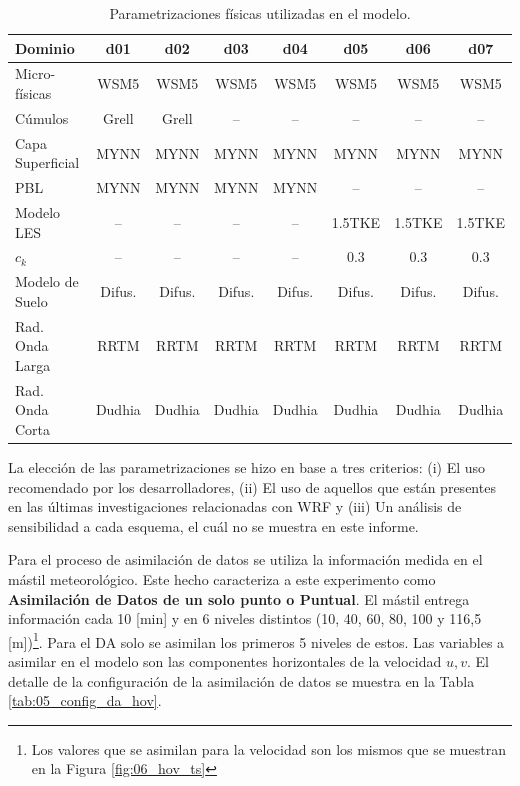 \begin{table}[h!]
	\caption{Parametrizaciones físicas utilizadas en el modelo.}\label{tab:05_param_hov}
	\centering\footnotesize
	\begin{tabular}{lccccccc}
		\toprule
		Dominio 				& d01	&	d02	&	d03	&	d04	&	d05	&	d06 &	d07 \\
		\midrule
		Micro-físicas		 	& WSM5 & WSM5 & WSM5 &WSM5&WSM5&WSM5&WSM5  \\
		Cúmulos			 		& Grell & Grell & -- & -- & -- & -- & -- \\ 
		Capa Superficial	 	& MYNN & MYNN & MYNN & MYNN & MYNN & MYNN & MYNN \\
		PBL				 		& MYNN & MYNN & MYNN & MYNN & -- & -- & -- \\
		Modelo LES				 		& -- & -- & -- & -- & 1.5TKE & 1.5TKE & 1.5TKE \\
		$c_k$				 		& -- & -- & -- & -- & 0.3 & 0.3 & 0.3 \\
		Modelo de Suelo 		& Difus.\footnotemark & Difus. & Difus. & Difus. & Difus. & Difus. & Difus. \\
		Rad. Onda Larga	& RRTM &RRTM&RRTM&RRTM&RRTM&RRTM&RRTM \\
		Rad. Onda Corta	& Dudhia &Dudhia&Dudhia&Dudhia&Dudhia&Dudhia&Dudhia \\
		\bottomrule
	\end{tabular}
\end{table}


La elección de las parametrizaciones se hizo en base a tres criterios: (i) El uso recomendado por los desarrolladores, (ii) El uso de aquellos que están presentes en las últimas investigaciones relacionadas con WRF y (iii) Un análisis de sensibilidad a cada esquema, el cuál no se muestra en este informe.

Para el proceso de asimilación de datos se utiliza la información medida en el mástil meteorológico. Este hecho caracteriza a este experimento como \textbf{Asimilación de Datos de un solo punto o Puntual}. El mástil entrega información cada 10 [min] y en 6 niveles distintos (10, 40, 60, 80, 100 y 116,5 [m])\footnote{Los valores que se asimilan para la velocidad son los mismos que se muestran en la Figura \ref{fig:06_hov_ts}}. Para el DA solo se asimilan los primeros 5 niveles de estos. Las variables a asimilar en el modelo son las componentes horizontales de la velocidad $u,v$. El detalle de la configuración de la asimilación de datos se muestra en la Tabla \ref{tab:05_config_da_hov}.

